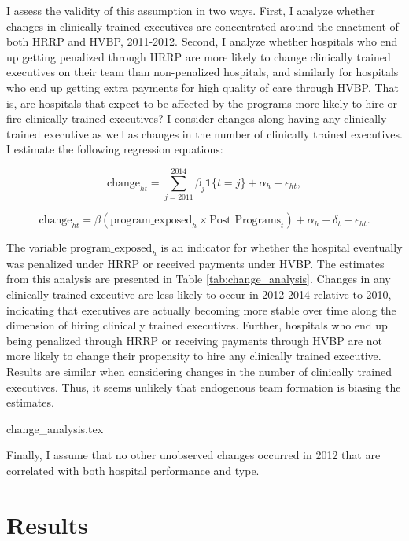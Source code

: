 \documentclass[12pt]{article}
\begin{document}
     I assess the validity of this assumption in two ways. First, I analyze whether changes in clinically trained executives are concentrated around the enactment of both HRRP and HVBP, 2011-2012. Second, I analyze whether hospitals who end up getting penalized through HRRP are more likely to change clinically trained executives on their team than non-penalized hospitals, and similarly for hospitals who end up getting extra payments for high quality of care through HVBP. That is, are hospitals that expect to be affected by the programs more likely to hire or fire clinically trained executives? I consider changes along having any clinically trained executive as well as changes in the number of clinically trained executives. I estimate the following regression equations:

    \begin{equation}\label{eq:change1}
    \text{change}_{ht} = \sum_{j=2011}^{2014}\beta_j\mathbf{1}\{t=j\} + \alpha_h + \epsilon_{ht},
    \end{equation}

    \begin{equation}\label{eq:change2}
    \text{change}_{ht} = \beta(\text{program\_exposed}_{h} \times \text{Post Programs}_t)+ \alpha_h + \delta_t + \epsilon_{ht}.
    \end{equation}

    The variable $\text{program\_exposed}_{h}$ is an indicator for whether the hospital eventually was penalized under HRRP or received payments under HVBP. The estimates from this analysis are presented in Table \ref{tab:change_analysis}. Changes in any clinically trained executive are less likely to occur in 2012-2014 relative to 2010, indicating that executives are actually becoming more stable over time along the dimension of hiring clinically trained executives. Further, hospitals who end up being penalized through HRRP or receiving payments through HVBP are not more likely to change their propensity to hire any clinically trained executive. Results are similar when considering changes in the number of clinically trained executives. Thus, it seems unlikely that endogenous team formation is biasing the estimates.

     {change_analysis.tex}

    Finally, I assume that no other unobserved changes occurred in 2012 that are correlated with both hospital performance and type. 

    
    
    \section{Results}
\end{document}
